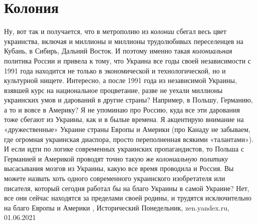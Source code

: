  
 
 
 
 
\chapter{Колония}

Ну, вот так и получается, что в метрополию из \emph{колонии} сбегал весь цвет
украинства, включая и миллионы и миллионы трудолюбивых переселенцев на Кубань,
в Сибирь, Дальний Восток. И поэтому именно такая \emph{колониальная} политика России и
привела к тому, что Украина все годы своей независимости с 1991 года находится
не только в экономической и технологической, но и культурной нищете.
Интересно, а после 1991 года из независимой Украины, взявшей курс на
национальное процветание, разве не уехали миллионы украинских умов и дарований
в другие страны? Например, в Польшу, Германию, а то и вовсе в Америку? Я не
упоминаю про Россию, куда все эти дарования тоже сбегают из Украины, как и в
былые времена. Я акцентирую внимание на «дружественные» Украине страны Европы и
Америки (про Канаду не забываем, где огромная украинская диаспора, просто
переполненная всякими «талантами»). И если идти по логике современных
украинских пропагандистов, то Польша с Германией и Америкой проводят точно
такую же \emph{колониальную политику} высасывания мозгов из Украины, какую все время
проводила и Россия. Вы можете назвать хоть одного современного украинского
изобретателя или писателя, который сегодня работал бы на благо Украины в самой
Украине? Нет, все они сейчас находятся за пределами своей родины, и трудятся
исключительно на благо Европы и Америки
, 
Исторический Понедельник, zen.yandex.ru, 01.06.2021

